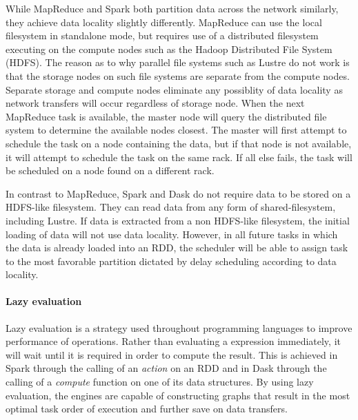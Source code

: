                     While MapReduce and Spark both partition data across the 
                    network similarly, they achieve data locality slightly 
                    differently. MapReduce can use the local filesystem in 
                    standalone mode, but requires use of a distributed 
                    filesystem executing on the compute nodes such as the 
                    Hadoop Distributed File System (HDFS). The reason as to why
                    parallel file systems such as Lustre do not work is that 
                    the storage nodes on such file systems are separate from 
                    the compute nodes. Separate storage and compute nodes 
                    eliminate any possiblity of data locality as network 
                    transfers will occur regardless of storage node. When the 
                    next MapReduce task is available, the master node will 
                    query the distributed file system to determine the 
                    available nodes closest. The master will first attempt to
                    schedule the task on a node containing the data, but if 
                    that node is not available, it will attempt to schedule
                    the task on the same rack. If all else fails, the task will
                    be scheduled on a node found on a different rack. 

                    In contrast to MapReduce, Spark and Dask do not require 
                    data to 
                    be stored on a HDFS-like filesystem. They can read data 
                    from
                    any form of shared-filesystem, including Lustre. If data 
                    is extracted from a non HDFS-like filesystem, the initial 
                    loading of data will not use data locality. However, in all
                    future tasks in which the data is already loaded into an 
                    RDD, the scheduler will be able to assign task to the most
                    favorable partition dictated by delay scheduling according
                    to data locality.

                    
                \paragraph{Lazy evaluation}

                    Lazy evaluation is a strategy used throughout programming languages
                    to improve performance of operations. Rather than
                    evaluating a expression immediately, it will wait until it 
                    is required in order to compute the result. This is 
                    achieved in Spark through the calling of an \textit{action}
                    on an RDD and in Dask through the calling of a 
                    \textit{compute} function on one of its data structures.
                    By using lazy evaluation, the engines are capable of 
                    constructing graphs that result in the most optimal
                    task order of execution and further save on data transfers. 

